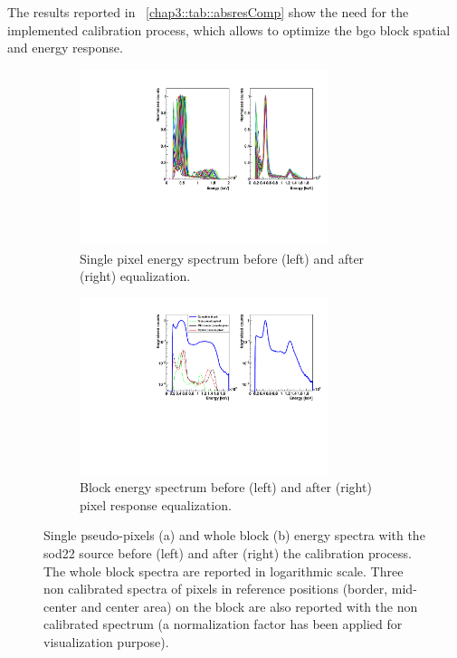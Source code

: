 The results reported in \tablename~\ref{chap3::tab::absresComp} show the need for the implemented calibration process, which allows to optimize the \gls{bgo} block spatial and energy response. 

\begin{figure}
\begin{subfigure}[t]{1\textwidth}
\centering
\includegraphics[width=0.8\textwidth]{03_GraphicFiles/chapter3_CLaRySproto/Absorber/images/EspectraOverlap_noAngles.pdf}
\caption{Single pixel energy spectrum before (left) and after (right) equalization.}
\label{chap3::fig::abssinglePixCal}
\end{subfigure}
\begin{subfigure}[t]{1\textwidth}
\centering
\includegraphics[width=0.8\textwidth]{03_GraphicFiles/chapter3_CLaRySproto/Absorber/images/Espectra_withSingles.pdf}
\caption{Block energy spectrum before (left) and after (right) pixel response equalization.}
\label{chap3::fig::absEspectrumCal}
\end{subfigure}
\caption{Single pseudo-pixels (a) and whole block (b) energy spectra with the \gls{sod22} source before (left) and after (right) the calibration process. The whole block spectra are reported in logarithmic scale. Three non calibrated spectra of pixels in reference positions (border, mid-center and center area) on the block are also reported with the non calibrated spectrum (a normalization factor has been applied for visualization purpose).}
\label{chap3::fig::abspixCal_analysis}
\end{figure}

